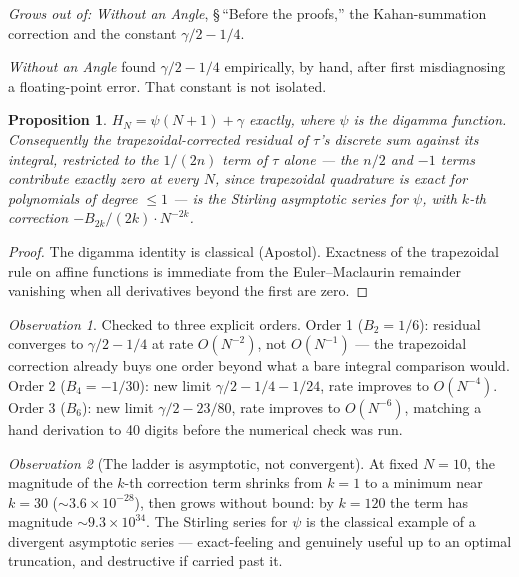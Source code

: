 \documentclass[10pt,a4paper]{article}
\theoremstyle{plain}
\newtheorem{proposition}{Proposition}
\theoremstyle{definition}
\theoremstyle{remark}
\newtheorem{observation}{Observation}
\begin{document}
\emph{Grows out of:} \emph{Without an Angle}, \S\,``Before the proofs,'' the Kahan-summation correction and the constant $\gamma/2-1/4$.

\emph{Without an Angle} found $\gamma/2-1/4$ empirically, by hand, after first misdiagnosing a floating-point error. That constant is not isolated.

\begin{proposition}
\label{prop:digamma}
$H_N=\psi(N+1)+\gamma$ exactly, where $\psi$ is the digamma function. Consequently the trapezoidal-corrected residual of $\tau$'s discrete sum against its integral, restricted to the $1/(2n)$ term of $\tau$ alone --- the $n/2$ and $-1$ terms contribute exactly zero at every $N$, since trapezoidal quadrature is exact for polynomials of degree $\le1$ --- is the Stirling asymptotic series for $\psi$, with $k$-th correction $-B_{2k}/(2k)\cdot N^{-2k}$.
\end{proposition}

\begin{proof}
The digamma identity is classical (Apostol). Exactness of the trapezoidal rule on affine functions is immediate from the Euler--Maclaurin remainder vanishing when all derivatives beyond the first are zero.
\end{proof}

\begin{observation}
Checked to three explicit orders. Order 1 ($B_2=1/6$): residual converges to $\gamma/2-1/4$ at rate $O(N^{-2})$, not $O(N^{-1})$ --- the trapezoidal correction already buys one order beyond what a bare integral comparison would. Order 2 ($B_4=-1/30$): new limit $\gamma/2-1/4-1/24$, rate improves to $O(N^{-4})$. Order 3 ($B_6$): new limit $\gamma/2-23/80$, rate improves to $O(N^{-6})$, matching a hand derivation to 40 digits before the numerical check was run.
\end{observation}

\begin{observation}[The ladder is asymptotic, not convergent]
\label{obs:asymptotic}
At fixed $N=10$, the magnitude of the $k$-th correction term shrinks from $k=1$ to a minimum near $k=30$ ($\sim3.6\times10^{-28}$), then grows without bound: by $k=120$ the term has magnitude $\sim9.3\times10^{34}$. The Stirling series for $\psi$ is the classical example of a divergent asymptotic series --- exact-feeling and genuinely useful up to an optimal truncation, and destructive if carried past it.
\end{observation}
\end{document}
